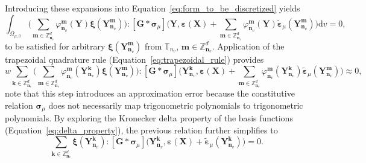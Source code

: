 Introducing these expansions into Equation~\eqref{eq:form_to_be_discretized} yields
\begin{equation}
\int_{\Omega_{\mu,0}}\Big(\sum_{\bm  m \in \mathbb{Z}_{\bm n_v}^{d}} \varphi_{\bm n_v}^{\bm  m}(\bm{Y}) \bm\xi\left(\bm{Y}_{\bm n_v}^{\bm  m}\right)  \Big ):[\bm{G} * \bm{\sigma}_\mu]\Big(\bm{Y}, \bm{\varepsilon}(\bm X)+\sum_{\bm  m \in \mathbb{Z}_{\bm n_v}^{d}} \varphi_{\bm n_v}^{\bm  m}(\bm{Y}) \tilde{\bm \varepsilon}_\mu \left(\bm Y_{\bm n_v}^{\bm  m}\right) \Big) \mathrm{d} v=0,
\end{equation}
to be satisfied for arbitrary \(\bm\xi\left(\bm{Y}_{\bm n_v}^{\bm  m}\right)\) from \(\mathbb T_{n_v}\), \(\bm m \in \mathbb Z^d_{\bm n_v}\).
Application of the trapezoidal quadrature rule (Equation~\eqref{eq:trapezoidal_rule}) provides
\begin{equation}
w \sum_{\bm  k \in \mathbb{Z}_{\bm n_v}^{d}}\Big(\sum_{\bm  m \in \mathbb{Z}_{\bm n_v}^{d}} \varphi_{\bm n_v}^{\bm  m}(\bm Y_{\bm n_v}^{\bm  k}) \bm\xi\left(\bm{Y}_{\bm n_v}^{\bm  m}\right)\Big):[\bm G * \bm{\sigma}_\mu]\Big(\bm Y_{\bm n_v}^{\bm  k}, \bm \varepsilon(\bm X)+\sum_{\bm  m \in \mathbb{Z}_{\bm n_v}^{d}} \varphi_{\bm n_v}^{\bm  m}\left(\bm Y_{\bm n_v}^{\bm  k}\right) \tilde{\bm \varepsilon}_\mu \left(\bm Y_{\bm n_v}^{\bm  m}\right)\Big) \approx 0,
\end{equation}
note that this step introduces an approximation error because the constitutive relation \(\bm{\sigma}_\mu\) does not necessarily map trigonometric polynomials to trigonometric polynomials.
By exploring the Kronecker delta property of the basis functions (Equation~\eqref{eq:delta_property}), the previous relation further simplifies to
\begin{equation} \label{eq:final_variational_form}
\sum_{\bm  k \in \mathbb{Z}_{\bm n_v}^{d}} \bm\xi\left(\bm{Y}_{\bm n_v}^{\bm  k}\right):[\bm G * \bm\sigma_\mu]\Big(\bm Y_{\bm n_v}^{\bm k}, \bm \varepsilon(\bm X)+\tilde{\bm \varepsilon}_\mu \left(\bm Y_{\bm n_v}^{\bm  k}\right)\Big)=0.
\end{equation}

